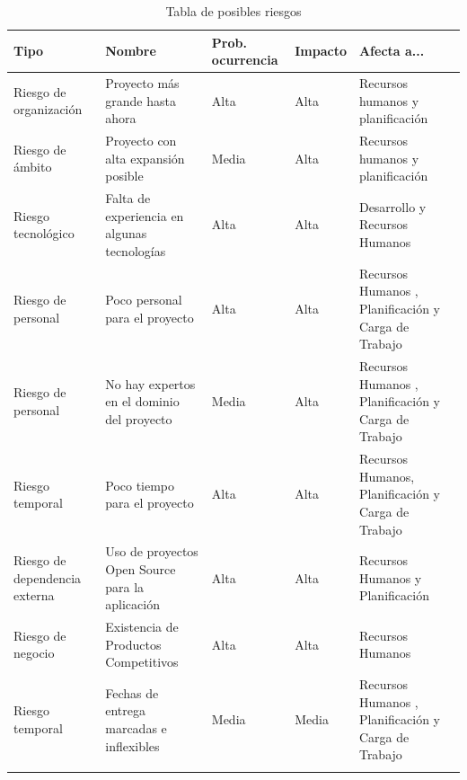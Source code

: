 \begin{center}
	\begin{xltabular}{\textwidth}{|X|X|X|X|X|}
		\hline
		{}\textbf{Tipo} & {}\textbf{Nombre} & {}\textbf{Prob. ocurrencia} & {}\textbf{Impacto} & {}\textbf{Afecta a...} \\
		\hline
		Riesgo de organización & Proyecto más grande hasta ahora & Alta & Alta & Recursos humanos y planificación \\
		\hline
		Riesgo de ámbito & Proyecto con alta expansión posible & Media & Alta & Recursos humanos y planificación \\
		\hline
		Riesgo tecnológico & Falta de experiencia en algunas tecnologías & Alta & Alta & Desarrollo y Recursos Humanos \\
		\hline
		Riesgo de personal & Poco personal para el proyecto & Alta & Alta & Recursos Humanos , Planificación y Carga de Trabajo \\
		\hline
		Riesgo de personal & No hay expertos en el dominio del proyecto & Media & Alta & Recursos Humanos , Planificación y Carga de Trabajo \\
		\hline
		Riesgo temporal & Poco tiempo para el proyecto & Alta & Alta & Recursos Humanos, Planificación y Carga de Trabajo\\
		\hline
		Riesgo de dependencia externa & Uso de proyectos Open Source para la aplicación & Alta & Alta & Recursos Humanos y Planificación \\
		\hline
		Riesgo de negocio & Existencia de Productos Competitivos  & Alta & Alta & Recursos Humanos \\
		\hline
		Riesgo temporal & Fechas de entrega marcadas e inflexibles & Media & Media & Recursos Humanos , Planificación y Carga de Trabajo \\
		\hline
		
		\caption{Tabla de posibles riesgos}
	\end{xltabular}
\end{center}


